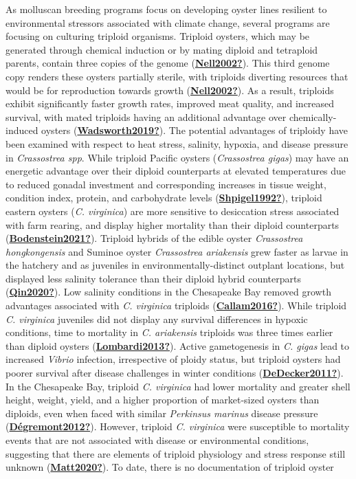 \documentclass [11pt, proquest] {uwthesis}[2015/03/03]
\begin{document}
As molluscan breeding programs focus on developing oyster lines resilient to environmental stressors associated with climate change, several programs are focusing on culturing triploid organisms. Triploid oysters, which may be generated through chemical induction or by mating diploid and tetraploid parents, contain three copies of the genome (\protect\hyperlink{ref-Nell2002}{\textbf{Nell2002?}}). This third genome copy renders these oysters partially sterile, with triploids diverting resources that would be for reproduction towards growth (\protect\hyperlink{ref-Nell2002}{\textbf{Nell2002?}}). As a result, triploids exhibit significantly faster growth rates, improved meat quality, and increased survival, with mated triploids having an additional advantage over chemically-induced oysters (\protect\hyperlink{ref-Wadsworth2019}{\textbf{Wadsworth2019?}}). The potential advantages of triploidy have been examined with respect to heat stress, salinity, hypoxia, and disease pressure in \emph{Crassostrea spp}. While triploid Pacific oysters (\emph{Crassostrea gigas}) may have an energetic advantage over their diploid counterparts at elevated temperatures due to reduced gonadal investment and corresponding increases in tissue weight, condition index, protein, and carbohydrate levels (\protect\hyperlink{ref-Shpigel1992}{\textbf{Shpigel1992?}}), triploid eastern oysters (\emph{C. virginica}) are more sensitive to desiccation stress associated with farm rearing, and display higher mortality than their diploid counterparts (\protect\hyperlink{ref-Bodenstein2021}{\textbf{Bodenstein2021?}}). Triploid hybrids of the edible oyster \emph{Crassostrea hongkongensis} and Suminoe oyster \emph{Crassostrea ariakensis} grew faster as larvae in the hatchery and as juveniles in environmentally-distinct outplant locations, but displayed less salinity tolerance than their diploid hybrid counterparts (\protect\hyperlink{ref-Qin2020}{\textbf{Qin2020?}}). Low salinity conditions in the Chesapeake Bay removed growth advantages associated with \emph{C. virginica} triploids (\protect\hyperlink{ref-Callam2016}{\textbf{Callam2016?}}). While triploid \emph{C. virginica} juveniles did not display any survival differences in hypoxic conditions, time to mortality in \emph{C. ariakensis} triploids was three times earlier than diploid oysters (\protect\hyperlink{ref-Lombardi2013}{\textbf{Lombardi2013?}}). Active gametogenesis in \emph{C. gigas} lead to increased \emph{Vibrio} infection, irrespective of ploidy status, but triploid oysters had poorer survival after disease challenges in winter conditions (\protect\hyperlink{ref-DeDecker2011}{\textbf{DeDecker2011?}}). In the Chesapeake Bay, triploid \emph{C. virginica} had lower mortality and greater shell height, weight, yield, and a higher proportion of market-sized oysters than diploids, even when faced with similar \emph{Perkinsus marinus} disease pressure (\protect\hyperlink{ref-Duxe9gremont2012}{\textbf{Dégremont2012?}}). However, triploid \emph{C. virginica} were susceptible to mortality events that are not associated with disease or environmental conditions, suggesting that there are elements of triploid physiology and stress response still unknown (\protect\hyperlink{ref-Matt2020}{\textbf{Matt2020?}}). To date, there is no documentation of triploid oyster 
\end{document}
